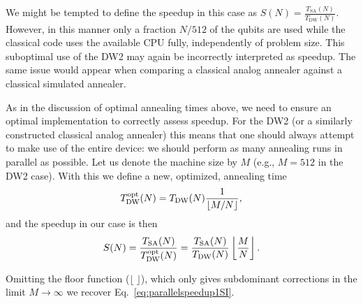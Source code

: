 We might be tempted to define the speedup in this case as
$S(N) = \frac{{T_{\textrm{SA}}(N)}}{{T_{\textrm{DW}}(N)}}$.
However, in this manner only a fraction $N/512$ of the qubits are used while the classical code uses the available CPU fully, independently of problem size. This suboptimal use of the DW2 may again be incorrectly interpreted as speedup. The same issue would appear when comparing a classical analog annealer against a classical simulated annealer.

 As in the discussion of optimal annealing times above, we need to ensure an optimal implementation to correctly assess speedup. For the DW2 (or a similarly constructed classical analog annealer) this means that one should always attempt to make use of the entire device: we should perform as many annealing runs in parallel as possible.
Let us denote the machine size by $M$ (e.g., $M=512$ in the DW2 case). With this we define a new, optimized, annealing time
\begin{equation}
T^{\rm opt}_{\textrm{DW}}(N) = T_{\textrm{DW}}(N) \frac{1}{\lfloor M/N\rfloor} ,
\label{eq:T^opt_DW}
\end{equation}
and the speedup in our case is then
\begin{equation}
S(N) = \frac{T_{\textrm{SA}}(N)}{T^{\rm opt}_{\textrm{DW}}(N)} =  \frac{T_{\textrm{SA}}(N)}{T_{\textrm{DW}}(N)} \left\lfloor\frac{M}{N}\right\rfloor.
\label{eq:parallelspeedup2}
\end{equation}

Omitting the floor function ($\lfloor \; \rfloor$), which only gives subdominant corrections in the limit $M\rightarrow\infty$ we recover Eq.~\eqref{eq:parallelspeedup1SI}.


